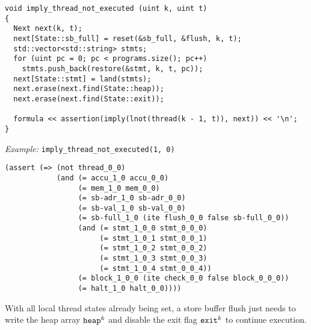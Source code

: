 \begin{lstlisting}[style=c++]
void imply_thread_not_executed (uint k, uint t)
{
  Next next(k, t);
  next[State::sb_full] = reset(&sb_full, &flush, k, t);
  std::vector<std::string> stmts;
  for (uint pc = 0; pc < programs.size(); pc++)
    stmts.push_back(restore(&stmt, k, t, pc));
  next[State::stmt] = land(stmts);
  next.erase(next.find(State::heap));
  next.erase(next.find(State::exit));

  formula << assertion(imply(lnot(thread(k - 1, t)), next)) << '\n';
}
\end{lstlisting}

\noindent
\emph{Example:} \lstinline[style=c++]{imply_thread_not_executed(1, 0)}

\begin{lstlisting}[language=smtlib]
(assert (=> (not thread_0_0)
            (and (= accu_1_0 accu_0_0)
                 (= mem_1_0 mem_0_0)
                 (= sb-adr_1_0 sb-adr_0_0)
                 (= sb-val_1_0 sb-val_0_0)
                 (= sb-full_1_0 (ite flush_0_0 false sb-full_0_0))
                 (and (= stmt_1_0_0 stmt_0_0_0)
                      (= stmt_1_0_1 stmt_0_0_1)
                      (= stmt_1_0_2 stmt_0_0_2)
                      (= stmt_1_0_3 stmt_0_0_3)
                      (= stmt_1_0_4 stmt_0_0_4))
                 (= block_1_0_0 (ite check_0_0 false block_0_0_0))
                 (= halt_1_0 halt_0_0))))
\end{lstlisting}


\newpage

\noindent
With all local thread states already being set,
a store buffer flush
just needs to write the heap array $\texttt{heap}^k$ and disable the exit flag $\texttt{exit}^k$ to continue execution.


